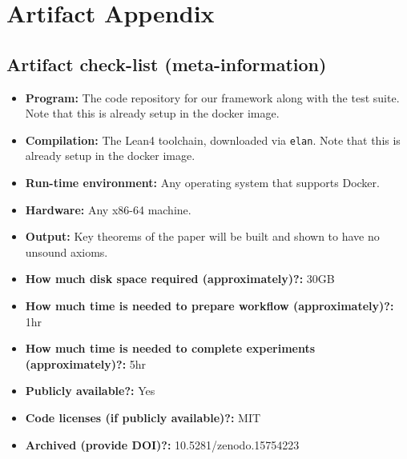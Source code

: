 \documentclass[onecolumn, sigconf]{acmart}
\begin{document}


\appendix
\section{Artifact Appendix}



\subsection{Artifact check-list (meta-information)}


{\small
\begin{itemize}
  \item {\bf Program: } The code repository for our framework along with the test suite. Note that this is already setup in the docker image.
  \item {\bf Compilation: } The Lean4 toolchain, downloaded via \texttt{elan}. Note that this is already setup in the docker image.
  \item {\bf Run-time environment: } Any operating system that supports Docker.
  \item {\bf Hardware: } Any x86-64 machine.
  \item {\bf Output: } Key theorems of the paper will be built and shown to have no unsound axioms.
  \item {\bf How much disk space required (approximately)?: } 30GB
  \item {\bf How much time is needed to prepare workflow (approximately)?: } 1hr
  \item {\bf How much time is needed to complete experiments (approximately)?: } 5hr
  \item {\bf Publicly available?: } Yes
  \item {\bf Code licenses (if publicly available)?: } MIT
  \item {\bf Archived (provide DOI)?: } 10.5281/zenodo.15754223
\end{itemize}
}
\end{document}
